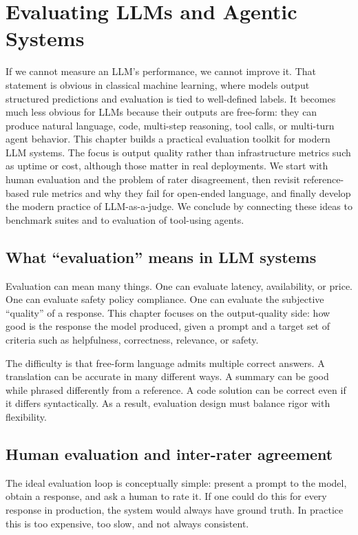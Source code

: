 
\chapter{Evaluating LLMs and Agentic Systems}
\label{chap:llm-evaluation}

If we cannot measure an LLM’s performance, we cannot improve it. That statement is obvious in classical machine learning, where models output structured predictions and evaluation is tied to well-defined labels. It becomes much less obvious for LLMs because their outputs are free-form: they can produce natural language, code, multi-step reasoning, tool calls, or multi-turn agent behavior. This chapter builds a practical evaluation toolkit for modern LLM systems. The focus is output quality rather than infrastructure metrics such as uptime or cost, although those matter in real deployments. We start with human evaluation and the problem of rater disagreement, then revisit reference-based rule metrics and why they fail for open-ended language, and finally develop the modern practice of LLM-as-a-judge. We conclude by connecting these ideas to benchmark suites and to evaluation of tool-using agents.

\section{What “evaluation” means in LLM systems}
Evaluation can mean many things. One can evaluate latency, availability, or price. One can evaluate safety policy compliance. One can evaluate the subjective “quality” of a response. This chapter focuses on the output-quality side: how good is the response the model produced, given a prompt and a target set of criteria such as helpfulness, correctness, relevance, or safety.

The difficulty is that free-form language admits multiple correct answers. A translation can be accurate in many different ways. A summary can be good while phrased differently from a reference. A code solution can be correct even if it differs syntactically. As a result, evaluation design must balance rigor with flexibility.

\section{Human evaluation and inter-rater agreement}
The ideal evaluation loop is conceptually simple: present a prompt to the model, obtain a response, and ask a human to rate it. If one could do this for every response in production, the system would always have ground truth. In practice this is too expensive, too slow, and not always consistent.

